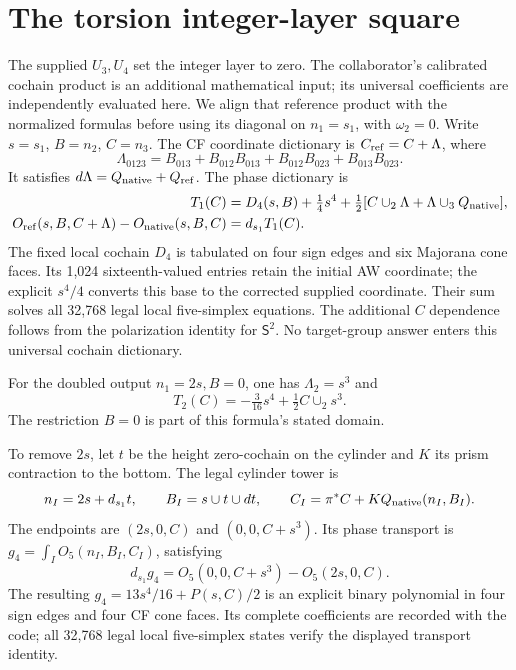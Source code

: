 \documentclass[11pt]{article}
\newcommand{\SSq}{\mathsf S}
\newcommand{\dd}{d_{s_1}}
\begin{document}
\section{The torsion integer-layer square}
The supplied $U_3,U_4$ set the integer layer to zero. The collaborator's
calibrated cochain product is an additional mathematical input; its
universal coefficients are independently evaluated here. We align that
reference product with the normalized formulas before using its diagonal
on $n_1=s_1$, with $\omega_2=0$. Write $s=s_1$, $B=n_2$, $C=n_3$.
The CF coordinate dictionary is $C_{\rm ref}=C+\Lambda$, where
\begin{equation}
 \Lambda_{0123}=B_{013}+B_{012}B_{013}
                  +B_{012}B_{023}+B_{013}B_{023}.
\end{equation}
It satisfies $d\Lambda=Q_{\rm native}+Q_{\rm ref}$. The phase dictionary is
\begin{align}
 T_1(C)&=D_4(s,B)+\tfrac14s^4+\tfrac12
       [C\cup_2\Lambda+\Lambda\cup_3Q_{\rm native}],\\
 O_{\rm ref}(s,B,C+\Lambda)-O_{\rm native}(s,B,C)&=\dd T_1(C).
\end{align}
The fixed local cochain $D_4$ is tabulated on four sign edges and six
Majorana cone faces. Its 1,024 sixteenth-valued entries retain the initial
AW coordinate; the explicit $s^4/4$ converts this base to the corrected
supplied coordinate. Their sum solves all 32,768 legal local five-simplex
equations. The additional $C$ dependence follows
from the polarization identity for $\SSq^2$. No target-group answer enters
this universal cochain dictionary.

For the doubled output $n_1=2s,B=0$, one has $\Lambda_2=s^3$ and
\begin{equation}
 T_2(C)=-\tfrac3{16}s^4+\tfrac12 C\cup_2s^3.
\end{equation}
The restriction $B=0$ is part of this formula's stated domain.

To remove $2s$, let $t$ be the height zero-cochain on the cylinder and
$K$ its prism contraction to the bottom. The legal cylinder tower is
\begin{equation}
 n_I=2s+\dd t,\qquad B_I=s\cup t\cup dt,\qquad
 C_I=\pi^*C+KQ_{
 \rm native}(n_I,B_I).
\end{equation}
The endpoints are $(2s,0,C)$ and $(0,0,C+s^3)$. Its phase transport is
$g_4=\int_I O_5(n_I,B_I,C_I)$, satisfying
\begin{equation}
 \dd g_4=O_5(0,0,C+s^3)-O_5(2s,0,C).
\end{equation}
The resulting $g_4=13s^4/16+P(s,C)/2$ is an explicit binary polynomial in
four sign edges and four CF cone faces. Its complete coefficients are
recorded with the code; all 32,768 legal local five-simplex states verify
the displayed transport identity.
\end{document}
